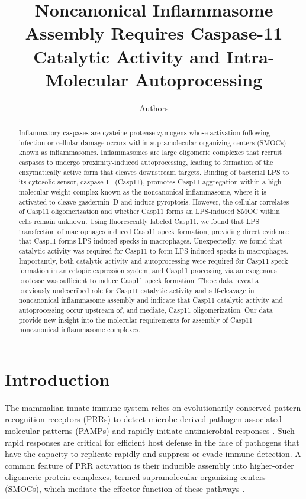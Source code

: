 \documentclass[11pt]{article}
\title{Noncanonical Inflammasome Assembly Requires Caspase-11 Catalytic Activity and Intra-Molecular Autoprocessing}
\author[1]{Authors}
\affil[1]{Division of Immunology and Molecular Medicine, University of California, Berkeley, Berkeley, CA, USA}
\date{}
\begin{document}
\maketitle

\begin{abstract}
Inflammatory caspases are cysteine protease zymogens whose activation following infection or cellular damage occurs within supramolecular organizing centers (SMOCs) known as inflammasomes. Inflammasomes are large oligomeric complexes that recruit caspases to undergo proximity-induced autoprocessing, leading to formation of the enzymatically active form that cleaves downstream targets. Binding of bacterial LPS to its cytosolic sensor, caspase-11 (Casp11), promotes Casp11 aggregation within a high molecular weight complex known as the noncanonical inflammasome, where it is activated to cleave gasdermin~D and induce pyroptosis. However, the cellular correlates of Casp11 oligomerization and whether Casp11 forms an LPS-induced SMOC within cells remain unknown. Using fluorescently labeled Casp11, we found that LPS transfection of macrophages induced Casp11 speck formation, providing direct evidence that Casp11 forms LPS-induced specks in macrophages. Unexpectedly, we found that catalytic activity was required for Casp11 to form LPS-induced specks in macrophages. Importantly, both catalytic activity and autoprocessing were required for Casp11 speck formation in an ectopic expression system, and Casp11 processing via an exogenous protease was sufficient to induce Casp11 speck formation. These data reveal a previously undescribed role for Casp11 catalytic activity and self-cleavage in noncanonical inflammasome assembly and indicate that Casp11 catalytic activity and autoprocessing occur upstream of, and mediate, Casp11 oligomerization. Our data provide new insight into the molecular requirements for assembly of Casp11 noncanonical inflammasome complexes.
\end{abstract}

\section{Introduction}

The mammalian innate immune system relies on evolutionarily conserved pattern recognition receptors (PRRs) to detect microbe-derived pathogen-associated molecular patterns (PAMPs) and rapidly initiate antimicrobial responses \citep{janeway1989,medzhitov2002}. Such rapid responses are critical for efficient host defense in the face of pathogens that have the capacity to replicate rapidly and suppress or evade immune detection. A common feature of PRR activation is their inducible assembly into higher-order oligomeric protein complexes, termed supramolecular organizing centers (SMOCs), which mediate the effector function of these pathways \citep{kagan2014,broz2016}.
\end{document}
